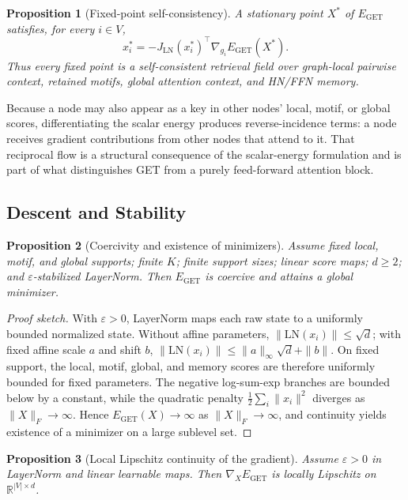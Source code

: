 \documentclass[11pt,a4paper]{article}
\newtheorem{proposition}{Proposition}
\begin{document}
\begin{proposition}[Fixed-point self-consistency]
\label{prop:fixedpt}
A stationary point $X^*$ of $E_{\mathrm{GET}}$ satisfies, for every $i\in V$,
\begin{equation}
  x_i^* = -{J_{\mathrm{LN}}(x_i^*)}^\top
           \nabla_{g_i} E_{\mathrm{GET}}(X^*).
  \label{eq:fixedpt-full}
\end{equation}
Thus every fixed point is a self-consistent retrieval field over graph-local
pairwise context, retained motifs, global attention context, and HN/FFN memory.
\end{proposition}

Because a node may also appear as a key in other nodes' local, motif, or global
scores, differentiating the scalar energy produces reverse-incidence terms: a
node receives gradient contributions from other nodes that attend to it. That
reciprocal flow is a structural consequence of the scalar-energy formulation
and is part of what distinguishes GET from a purely feed-forward attention
block.

\subsection{Descent and Stability}

\begin{proposition}[Coercivity and existence of minimizers]
\label{prop:coercive}
Assume fixed local, motif, and global supports; finite $K$; finite support
sizes; linear score maps; $d\ge 2$; and $\varepsilon$-stabilized LayerNorm. Then
$E_{\mathrm{GET}}$ is coercive and attains a global minimizer.
\end{proposition}

\begin{proof}[Proof sketch]
With $\varepsilon>0$, LayerNorm maps each raw state to a uniformly bounded
normalized state. Without affine parameters, $\|\mathrm{LN}(x_i)\|\le\sqrt d$;
with fixed affine scale $a$ and shift $b$,
$\|\mathrm{LN}(x_i)\|\le \|a\|_\infty\sqrt d+\|b\|$. On fixed support, the
local, motif, global, and memory scores are therefore uniformly bounded for
fixed parameters. The negative log-sum-exp branches are bounded below by a
constant, while the quadratic penalty
$\frac{1}{2}\sum_i\|x_i\|^2$ diverges as $\|X\|_F\to\infty$. Hence
$E_{\mathrm{GET}}(X)\to\infty$ as $\|X\|_F\to\infty$, and continuity yields
existence of a minimizer on a large sublevel set.
\end{proof}

\begin{proposition}[Local Lipschitz continuity of the gradient]
\label{prop:lipschitz}
Assume $\varepsilon>0$ in LayerNorm and linear learnable maps. Then
$\nabla_X E_{\mathrm{GET}}$ is locally Lipschitz on
$\mathbb{R}^{|V|\times d}$.
\end{proposition}
\end{document}
